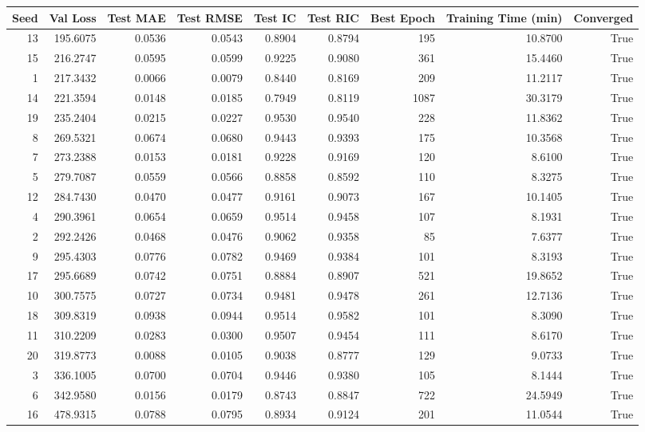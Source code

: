 \begin{tabular}{rrrrrrrrr}
\toprule
Seed & Val Loss & Test MAE & Test RMSE & Test IC & Test RIC & Best Epoch & Training Time (min) & Converged \\
\midrule
13 & 195.6075 & 0.0536 & 0.0543 & 0.8904 & 0.8794 & 195 & 10.8700 & True \\
15 & 216.2747 & 0.0595 & 0.0599 & 0.9225 & 0.9080 & 361 & 15.4460 & True \\
1 & 217.3432 & 0.0066 & 0.0079 & 0.8440 & 0.8169 & 209 & 11.2117 & True \\
14 & 221.3594 & 0.0148 & 0.0185 & 0.7949 & 0.8119 & 1087 & 30.3179 & True \\
19 & 235.2404 & 0.0215 & 0.0227 & 0.9530 & 0.9540 & 228 & 11.8362 & True \\
8 & 269.5321 & 0.0674 & 0.0680 & 0.9443 & 0.9393 & 175 & 10.3568 & True \\
7 & 273.2388 & 0.0153 & 0.0181 & 0.9228 & 0.9169 & 120 & 8.6100 & True \\
5 & 279.7087 & 0.0559 & 0.0566 & 0.8858 & 0.8592 & 110 & 8.3275 & True \\
12 & 284.7430 & 0.0470 & 0.0477 & 0.9161 & 0.9073 & 167 & 10.1405 & True \\
4 & 290.3961 & 0.0654 & 0.0659 & 0.9514 & 0.9458 & 107 & 8.1931 & True \\
2 & 292.2426 & 0.0468 & 0.0476 & 0.9062 & 0.9358 & 85 & 7.6377 & True \\
9 & 295.4303 & 0.0776 & 0.0782 & 0.9469 & 0.9384 & 101 & 8.3193 & True \\
17 & 295.6689 & 0.0742 & 0.0751 & 0.8884 & 0.8907 & 521 & 19.8652 & True \\
10 & 300.7575 & 0.0727 & 0.0734 & 0.9481 & 0.9478 & 261 & 12.7136 & True \\
18 & 309.8319 & 0.0938 & 0.0944 & 0.9514 & 0.9582 & 101 & 8.3090 & True \\
11 & 310.2209 & 0.0283 & 0.0300 & 0.9507 & 0.9454 & 111 & 8.6170 & True \\
20 & 319.8773 & 0.0088 & 0.0105 & 0.9038 & 0.8777 & 129 & 9.0733 & True \\
3 & 336.1005 & 0.0700 & 0.0704 & 0.9446 & 0.9380 & 105 & 8.1444 & True \\
6 & 342.9580 & 0.0156 & 0.0179 & 0.8743 & 0.8847 & 722 & 24.5949 & True \\
16 & 478.9315 & 0.0788 & 0.0795 & 0.8934 & 0.9124 & 201 & 11.0544 & True \\
\bottomrule
\end{tabular}
